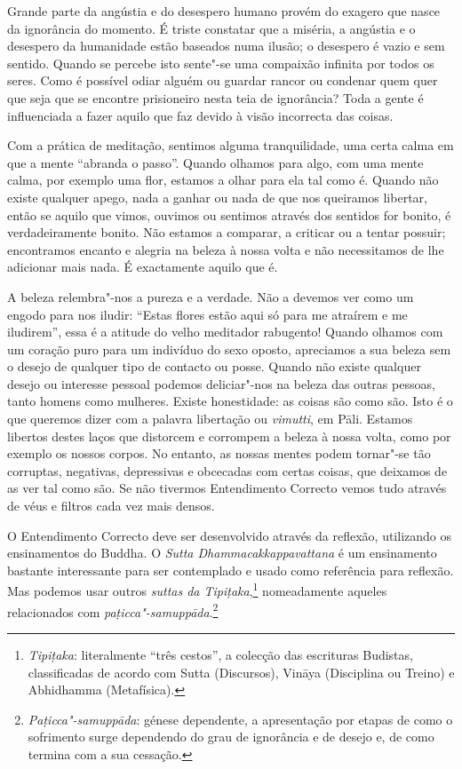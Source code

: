 Grande parte da angústia e do desespero humano provém do exagero que nasce da
ignorância do momento. É triste constatar que a miséria, a angústia e o
desespero da humanidade estão baseados numa ilusão; o desespero é vazio e sem
sentido. Quando se percebe isto sente"-se uma compaixão infinita por todos os
seres. Como é possível odiar alguém ou guardar rancor ou condenar quem quer que
seja que se encontre prisioneiro nesta teia de ignorância? Toda a gente é
influenciada a fazer aquilo que faz devido à visão incorrecta das coisas.

\sectionBreak

Com a prática de meditação, sentimos alguma tranquilidade, uma certa calma em
que a mente “abranda o passo”. Quando olhamos para algo, com uma mente calma,
por exemplo uma flor, estamos a olhar para ela tal como é. Quando não existe
qualquer apego, nada a ganhar ou nada de que nos queiramos libertar, então se
aquilo que vimos, ouvimos ou sentimos através dos sentidos for bonito, é
verdadeiramente bonito. Não estamos a comparar, a criticar ou a tentar possuir;
encontramos encanto e alegria na beleza à nossa volta e não necessitamos de lhe
adicionar mais nada. É exactamente aquilo que é.

A beleza relembra"-nos a pureza e a verdade. Não a devemos ver como um engodo
para nos iludir: “Estas flores estão aqui só para me atraírem e me iludirem”,
essa é a atitude do velho meditador rabugento! Quando olhamos com um coração
puro para um indivíduo do sexo oposto, apreciamos a sua beleza sem o desejo de
qualquer tipo de contacto ou posse. Quando não existe qualquer desejo ou
interesse pessoal podemos deliciar"-nos na beleza das outras pessoas, tanto
homens como mulheres. Existe honestidade: as coisas são como são. Isto é o que
queremos dizer com a palavra libertação ou \emph{vimutti}, em Pāli. Estamos
libertos destes laços que distorcem e corrompem a beleza à nossa volta, como por
exemplo os nossos corpos. No entanto, as nossas mentes podem tornar"-se tão
corruptas, negativas, depressivas e obcecadas com certas coisas, que deixamos de
as ver tal como são. Se não tivermos Entendimento Correcto vemos tudo através de
véus e filtros cada vez mais densos.

O Entendimento Correcto deve ser desenvolvido através da reflexão, utilizando os
ensinamentos do Buddha. O \emph{Sutta Dhammacakkappavattana} é um ensinamento
bastante interessante para ser contemplado e usado como referência para
reflexão. Mas podemos usar outros \emph{suttas da Tipiṭaka},\footnote{%
  \emph{Tipiṭaka}: literalmente “três cestos”, a colecção das escrituras
  Budistas, classificadas de acordo com Sutta (Discursos), Vināya (Disciplina ou
  Treino) e Abhidhamma (Metafísica).} nomeadamente aqueles relacionados com
\emph{paṭicca"-samuppāda}.\footnote{%
  \emph{Paṭicca"-samuppāda}: génese dependente, a apresentação por etapas de como
  o sofrimento surge dependendo do grau de ignorância e de desejo e, de como
  termina com a sua cessação.}


